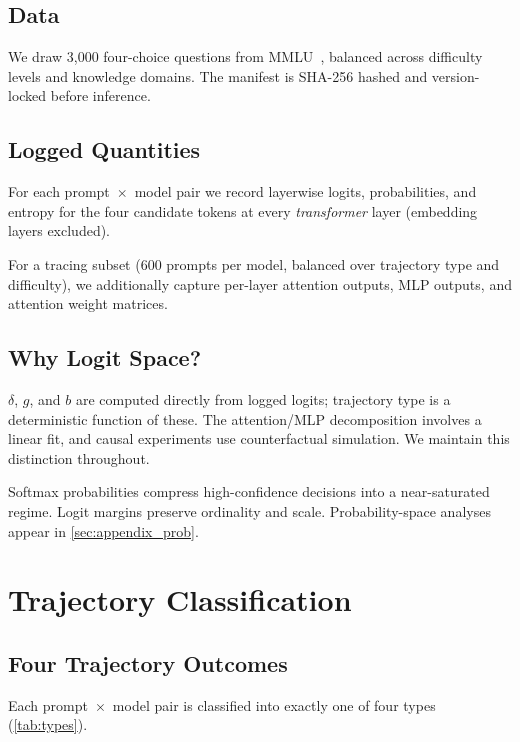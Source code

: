 \documentclass{article}
\begin{document}
\subsection{Data}

We draw 3{,}000 four-choice questions from MMLU~\cite{hendrycks2021}, balanced across difficulty levels and knowledge domains.  The manifest is SHA-256 hashed and version-locked before inference.

\subsection{Logged Quantities}

For each prompt~$\times$~model pair we record layerwise logits, probabilities, and entropy for the four candidate tokens at every \emph{transformer} layer (embedding layers excluded).

For a tracing subset (600 prompts per model, balanced over trajectory type and difficulty), we additionally capture per-layer attention outputs, MLP outputs, and attention weight matrices.

\subsection{Why Logit Space?}

$\delta$, $g$, and $b$ are computed directly from logged logits; trajectory type is a deterministic function of these.  The attention/MLP decomposition involves a linear fit, and causal experiments use counterfactual simulation.  We maintain this distinction throughout.

Softmax probabilities compress high-confidence decisions into a near-saturated regime.  Logit margins preserve ordinality and scale.  Probability-space analyses appear in \cref{sec:appendix_prob}.


\section{Trajectory Classification}
\label{sec:phase}

\subsection{Four Trajectory Outcomes}

Each prompt~$\times$~model pair is classified into exactly one of four types (\cref{tab:types}).
\end{document}
